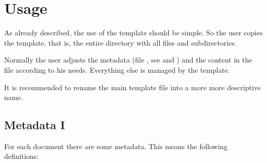 \section{Usage}

As already described, the use of the template should be simple. So the user
copies the template, that is, the entire directory with all files and
subdirectories.
\bigbreak

Normally the user adjusts the metadata (file ,
see  and ) and the
content in the file  according to his needs.
Everything else is managed by the template.
\bigbreak

It is recommended to rename the main template file 
into a more more descriptive name.


\subsection{Metadata I}\label{subsec:Metadata-I}

For each document there are some metadata. This means the following definitions:

